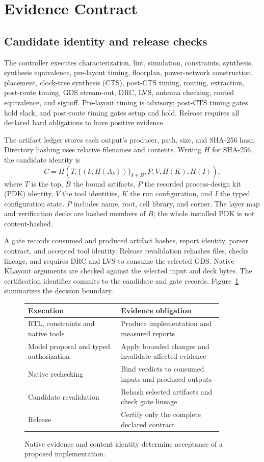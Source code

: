 \documentclass[runningheads]{llncs}
\begin{document}
\section{Evidence Contract}
\subsection{Candidate identity and release checks}
The controller executes characterization, lint, simulation, constraints,
synthesis, synthesis equivalence, pre-layout timing, floorplan, power-network
construction, placement, clock-tree synthesis (CTS), post-CTS timing, routing,
extraction, post-route timing, GDS stream-out, DRC, LVS, antenna checking,
routed equivalence, and signoff. Pre-layout timing is advisory; post-CTS timing
gates hold slack, and post-route timing gates setup and hold. Release requires
all declared hard obligations to have positive evidence.

The artifact ledger stores each output's producer, path, size, and SHA-256
hash. Directory hashing uses relative filenames and contents. Writing $H$ for
SHA-256, the candidate identity is
\begin{equation}
 C=H\!\left(T,\{(k,H(A_k))\}_{k\in B},P,V,H(K),H(I)\right),
\end{equation}
where $T$ is the top, $B$ the bound artifacts, $P$ the recorded process-design
kit (PDK) identity, $V$ the tool identities, $K$ the run configuration, and $I$
the typed configuration state. $P$ includes name, root, cell library, and
corner. The layer map and verification decks are hashed members of $B$;
the whole installed PDK is not content-hashed.

A gate records consumed and produced artifact hashes, report identity, parser
contract, and accepted tool identity. Release revalidation rehashes files,
checks lineage, and requires DRC and LVS to consume the selected GDS. Native
KLayout arguments are checked against the selected input and deck bytes.
The certification identifier commits to the candidate and gate records.
Figure~\ref{fig:contract} summarizes the decision boundary.

\begin{figure}[!htbp]\centering\small
\begin{tabular}{p{0.43\linewidth}p{0.47\linewidth}}
\toprule
Execution & Evidence obligation\\\midrule
RTL, constraints and native tools & Produce implementation and measured reports\\
Model proposal and typed authorization & Apply bounded changes and invalidate affected evidence\\
Native rechecking & Bind verdicts to consumed inputs and produced outputs\\
Candidate revalidation & Rehash selected artifacts and check gate lineage\\
Release & Certify only the complete declared contract\\\bottomrule
\end{tabular}
\caption{Native evidence and content identity determine acceptance of a proposed implementation.}
\label{fig:contract}\end{figure}
\end{document}
